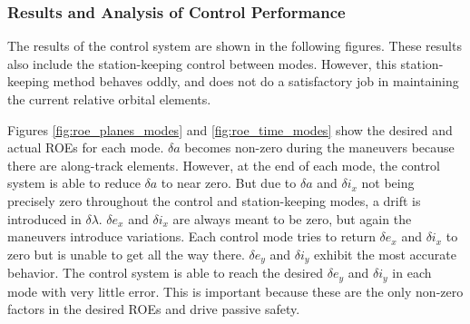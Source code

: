 \subsubsection{Results and Analysis of Control Performance} \label{sec:analysis_of_control}

The results of the control system are shown in the following figures. These results also include the station-keeping control between modes. However, this station-keeping method behaves oddly, and does not do a satisfactory job in maintaining the current relative orbital elements.

Figures \ref{fig:roe_planes_modes} and \ref{fig:roe_time_modes} show the desired and actual ROEs for each mode. $\delta a$ becomes non-zero during the maneuvers because there are along-track elements. However, at the end of each mode, the control system is able to reduce $\delta a$ to near zero. But due to $\delta a$ and $\delta i_x$ not being precisely zero throughout the control and station-keeping modes, a drift is introduced in $\delta \lambda$. $\delta e_x$ and $\delta i_x$ are always meant to be zero, but again the maneuvers introduce variations. Each control mode tries to return $\delta e_x$ and $\delta i_x$ to zero but is unable to get all the way there. $\delta e_y$ and $\delta i_y$ exhibit the most accurate behavior. The control system is able to reach the desired $\delta e_y$ and $\delta i_y$ in each mode with very little error. This is important because these are the only non-zero factors in the desired ROEs and drive passive safety. 

